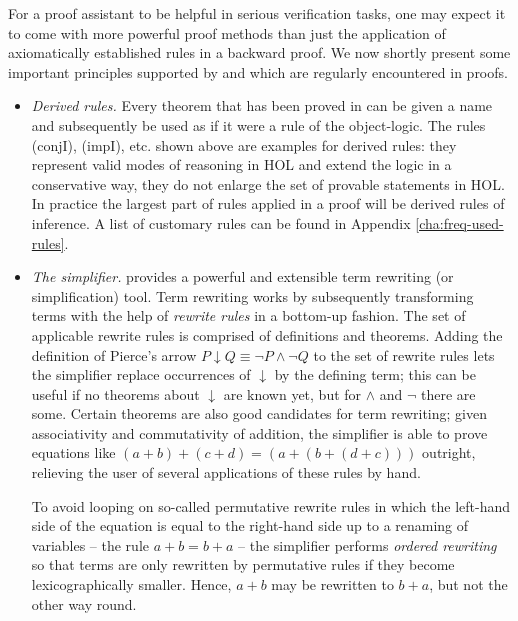 For a proof assistant to be helpful in serious verification tasks, one may
expect it to come with more powerful proof methods than just the application of
axiomatically established rules in a backward proof. We now shortly present some
important principles supported by \Isabelle and which are regularly encountered
in proofs.

\begin{itemize}
\item \emph{Derived rules.} Every theorem that has been proved in \Isabelle can
  be given a name and subsequently be used as if it were a rule of the
  object-logic. The rules (conjI), (impI), etc. shown above are examples for
  derived rules: they represent valid modes of reasoning in HOL and
  extend the logic in a conservative way, \IE they do not enlarge the set of
  provable statements in HOL. In practice the largest part of rules applied in a
  proof will be derived rules of inference. A list of customary rules can be
  found in Appendix \ref{cha:freq-used-rules}.

\item \emph{The simplifier.} \Isabelle provides a powerful and extensible term
  rewriting (or simplification) tool. Term rewriting works by subsequently
  transforming terms with the help of \emph{rewrite rules} in a bottom-up
  fashion. The set of applicable rewrite rules is comprised of definitions and
  theorems. Adding the definition of Pierce's arrow $P\downarrow Q \equiv \lnot P \land \lnot Q$ to the set
  of rewrite rules lets the simplifier replace  occurrences of $\downarrow$ by the defining
  term; this can be useful if no theorems about $\downarrow$ are known yet, but for $\land$
  and $\lnot$ there are some. Certain theorems are also good candidates for term
  rewriting; given associativity and commutativity of
  addition, the simplifier is able to prove equations like $(a + b) + (c + d) =
  (a + (b + (d + c)))$ outright, relieving the user of several applications of
  these rules by hand.

  To avoid looping on so-called permutative rewrite rules in which the left-hand
  side of the equation is equal to the right-hand side up to a renaming of
  variables -- \EG the rule $a + b = b + a$ -- the simplifier performs
  \emph{ordered rewriting} so that terms are only rewritten by permutative rules
  if they become lexicographically smaller. Hence, $a + b$ may be rewritten to
  $b + a$, but not the other way round.


\end{itemize}
